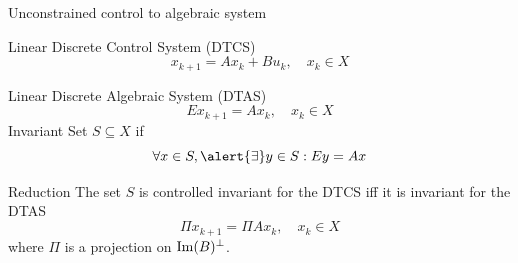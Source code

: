 \begin{frame}{Unconstrained control to algebraic system}
  \begin{block}{Linear Discrete \alert{Control} System (DT\alert{C}S)}
    \[ x_{k+1} = A x_k + B u_k, \quad x_k \in X \]
  \end{block}
  \begin{block}{Linear Discrete \alert{Algebraic} System (DT\alert{A}S)}
    \[ Ex_{k+1} = A x_k, \quad x_k \in X \]
    Invariant Set $S \subseteq X$ if
    \[ \forall x \in S, \alert{\exists} y \in S : Ey = Ax \]
  \end{block}
  \begin{block}{Reduction}
    The set $S$ is controlled invariant for the DT\alert{C}S iff
    it is invariant for the DT\alert{A}S
    \[ \Pi x_{k+1} = \Pi A x_k, \quad x_k \in X \]
    where $\Pi$ is a projection on $\operatorname{Im}(B)^\perp$.
  \end{block}
\end{frame}
